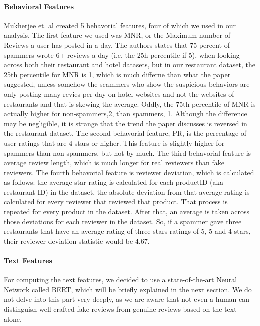 \documentclass[man, floatsintext, 10pt]{apa6}
\begin{document}
\paragraph{Behavioral Features} Mukherjee et. al created 5 behavorial features, four of which we used in our analysis. The first feature we used was MNR, or the Maximum number of Reviews a user has posted in a day. The authors states that 75 percent of spammers wrote 6+ reviews a day (i.e. the 25h percentile if 5), when looking across both their restaurant and hotel datasets, but in our restaurant dataset, the 25th percentile for MNR is 1, which is much differne than what the paper suggested, unless somehow the scammers who show the suspicious behaviors are only posting many revies per day on hotel websites and not the websites of restaurants and that is skewing the average. Oddly, the 75th percentile of MNR is actually higher for non-spammers,2, than spammers, 1. Although the difference may be negligible, it is strange that the trend the paper discusses is reversed in the restaurant dataset. The second behavorial feature, PR, is the percentage of user ratings that are 4 stars or higher. This feature is slightly higher for spammers than non-spammers, but not by much. The third behavorial feature is average review length, which is much longer for real reviewers than fake reviewers. The fourth behavorial feature is reviewer deviation, which is calculated as follows: the average star rating is calculated for each productID (aka restaurant ID) in the dataset, the absolute deviation from that average rating is calculated for every reviewer that reviewed that product. That process is repeated for every product in the dataset. After that, an average is taken across those deviations for each reviewer in the dataset. So, if a spammer gave three restaurants that have an average rating of three stars ratings of 5, 5 and 4 stars, their reviewer deviation statistic would be 4.67.

 \vspace{2mm}
 
\paragraph{Text Features} For computing the text features, we decided to use a state-of-the-art Neural Network called BERT, which will be briefly explained in the next section. We do not delve into this part very deeply, as we are aware that not even a human can distinguish well-crafted fake reviews from genuine reviews based on the text alone.
\end{document}
